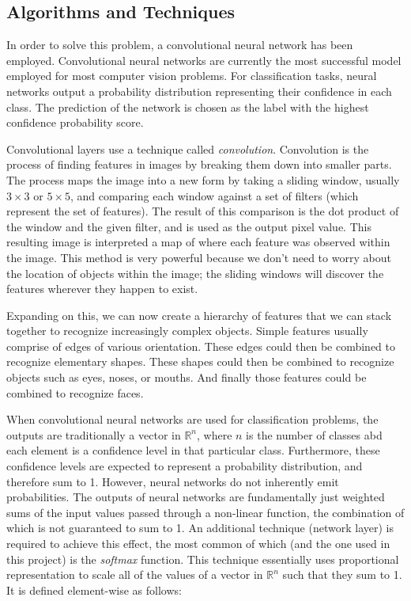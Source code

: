 \documentclass[12pt]{article}
\begin{document}
\subsection{Algorithms and Techniques} \label{sssec:algs}
In order to solve this problem, a convolutional neural network has been employed.
Convolutional neural networks are currently the most successful model employed for most computer vision problems.
For classification tasks, neural networks output a probability distribution representing their confidence in each class.
The prediction of the network is chosen as the label with the highest confidence probability score.

Convolutional layers use a technique called \textit{convolution}.
Convolution is the process of finding features in images by breaking them down into smaller parts.
The process maps the image into a new form by taking a sliding window, usually $3 \times 3$ or $5 \times 5$, and comparing each window against a set of filters (which represent the set of features). 
The result of this comparison is the dot product of the window and the given filter, and is used as the output pixel value.
This resulting image is interpreted a map of where each feature was observed within the image.
This method is very powerful because we don't need to worry about the location of objects within the image; the sliding windows will discover the features wherever they happen to exist.

Expanding on this, we can now create a hierarchy of features that we can stack together to recognize increasingly complex objects.
Simple features usually comprise of edges of various orientation.
These edges could then be combined to recognize elementary shapes.
These shapes could then be combined to recognize objects such as eyes, noses, or mouths.
And finally those features could be combined to recognize faces.

When convolutional neural networks are used for classification problems, the outputs are traditionally a vector in $\mathbb{R}^n$, where $n$ is the number of classes abd each element is a confidence level in that particular class. 
Furthermore, these confidence levels are expected to represent a probability distribution, and therefore sum to 1.
However, neural networks do not inherently emit probabilities.
The outputs of neural networks are fundamentally just weighted sums of the input values passed through a non-linear function, the combination of which is not guaranteed to sum to 1.
An additional technique (network layer) is required to achieve this effect, the most common of which (and the one used in this project) is the \textit{softmax} function.
This technique essentially uses proportional representation to scale all of the values of a vector in $\mathbb{R}^n$ such that they sum to 1.
It is defined element-wise as follows:
\end{document}
